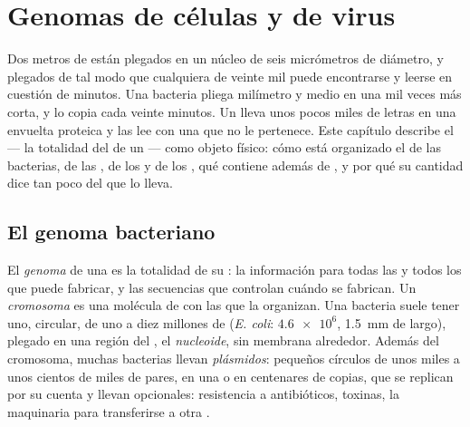 \chapter{Genomas de células y de virus}\label{ch:b1:genomes}

Dos metros de  están plegados en un núcleo de seis micrómetros de
diámetro, y plegados de tal modo que cualquiera de veinte mil  puede
encontrarse y leerse en cuestión de minutos. Una bacteria pliega milímetro y
medio en una  mil veces más corta, y lo copia cada veinte minutos. Un
 lleva unos pocos miles de letras en una envuelta proteica y las lee
con una  que no le pertenece. Este capítulo describe el \emph{}
--- la totalidad del  de un  --- como objeto físico: cómo está
organizado el  de las bacterias, de las , de los
 y de los , qué contiene además de , y por qué su
cantidad dice tan poco del  que lo lleva.

\section{El genoma bacteriano}

\begin{definition}\label{def:b1:genomes:genome}
El \emph{genoma} de una  es la totalidad de su : la
información para todas las  y todos los  que puede fabricar, y
las secuencias que controlan cuándo se fabrican. Un
\emph{cromosoma} es una molécula de  con las 
que la organizan. Una bacteria suele tener uno, circular, de uno a diez
millones de  (\emph{E. coli}: $\num{4.6e6}$, \qty{1.5}{mm} de
largo), plegado en una región del , el
\emph{nucleoide}, sin membrana alrededor. Además del
cromosoma, muchas bacterias llevan \emph{plásmidos}:
pequeños círculos de unos miles a unos cientos de miles de pares, en una o
en centenares de copias, que se replican por su cuenta y llevan 
opcionales: resistencia a antibióticos, toxinas, la maquinaria para
transferirse a otra .
\end{definition}


